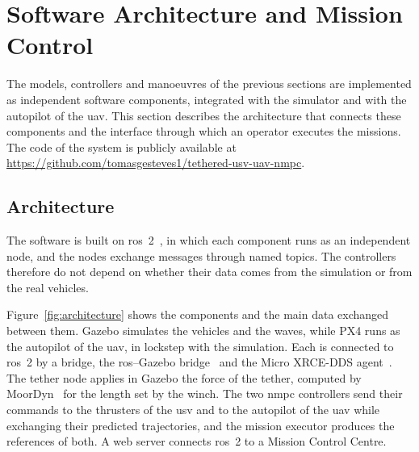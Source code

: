 
\section{Software Architecture and Mission Control}
\label{sec:software_architecture_and_dashboard}

The models, controllers and manoeuvres of the previous sections are implemented as independent software components, integrated with the simulator and with the autopilot of the \gls{uav}. This section describes the architecture that connects these components and the interface through which an operator executes the missions. The code of the system is publicly available at \url{https://github.com/tomasgesteves1/tethered-usv-uav-nmpc}.

\subsection{Architecture}
\label{subsec:integrated_software_architecture}

The software is built on \gls{ros}~2~\cite{macenski2022ros2}, in which each component runs as an independent node, and the nodes exchange messages through named topics. The controllers therefore do not depend on whether their data comes from the simulation or from the real vehicles.

Figure~\ref{fig:architecture} shows the components and the main data exchanged between them. Gazebo simulates the vehicles and the waves, while PX4 runs as the autopilot of the \gls{uav}, in lockstep with the simulation. Each is connected to \gls{ros}~2 by a bridge, the \gls{ros}--Gazebo bridge~\cite{ros_gz} and the Micro XRCE-DDS agent~\cite{micro_xrce_dds}. The tether node applies in Gazebo the force of the tether, computed by MoorDyn~\cite{hall2015moordyn} for the length set by the winch. The two \gls{nmpc} controllers send their commands to the thrusters of the \gls{usv} and to the autopilot of the \gls{uav} while exchanging their predicted trajectories, and the mission executor produces the references of both. A web server connects \gls{ros}~2 to a Mission Control Centre.

